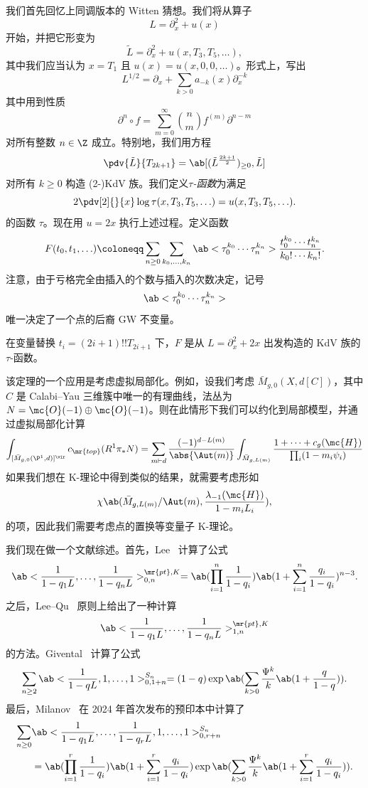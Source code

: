 我们首先回忆上同调版本的 Witten 猜想。我们将从算子
\[ L = \partial_x^2 + u(x) \]
开始，并把它形变为
\[ \tilde{L} = \partial_x^2 + u(x, T_3, T_5, \ldots), \]
其中我们应当认为 \(x = T_1\) 且 \(u(x) = u(x, 0, 0,\ldots)\)。形式上，写出
\[ L^{1/2} = \partial_x + \sum_{k > 0} a_{-k}(x) \partial_x^{-k} \]
其中用到性质
\[ \partial^n \circ f = \sum_{m = 0}^{\infty} \binom{n}{m} f^{(m)} \partial^{n-m} \]
对所有整数 \(n \in \Z\) 成立。特别地，我们用方程
\[ \pdv{\tilde{L}}{T_{2k+1}} = \ab[(\tilde{L}^{\frac{2k+1}{2}})_{\geq 0}, \tilde{L}] \]
对所有 \(k \geq 0\) 构造 (2-)KdV 族。我们定义\textit{\(\tau\)-函数}为满足
\[ 2 \pdv[2]{}{x}\log \tau(x, T_3, T_5, \ldots) = u(x, T_3, T_5, \ldots). \]
的函数 \(\tau\)。现在用 \(u = 2x\) 执行上述过程。定义函数
\[ F(t_0, t_1, \ldots) \coloneqq \sum_{n \geq 0} \sum_{k_0, \ldots, k_n} \ab<\tau_0^{k_0} \cdots \tau_n^{k_n}> \frac{t_0^{k_0} \cdots t_n^{k_n}}{k_0! \cdots k_n!}. \]
注意，由于亏格完全由插入的个数与插入的次数决定，记号
\[ \ab<\tau_0^{k_0} \cdots \tau_n^{k_n}> \]
唯一决定了一个点的后裔 GW 不变量。

\begin{thm}
    在变量替换 \(t_i = (2i+1)!! T_{2i+1}\) 下，\(F\) 是从 \(L = \partial_x^2 + 2x\) 出发构造的 KdV 族的 \(\tau\)-函数。
\end{thm}

该定理的一个应用是考虑虚拟局部化。例如，设我们考虑 \(\bar{M}_{g,0}(X, d[C])\)，其中 \(C\) 是 Calabi–Yau 三维簇中唯一的有理曲线，法丛为 \(N = \mc{O}(-1)\oplus \mc{O}(-1)\)。则在此情形下我们可以约化到局部模型，并通过虚拟局部化计算
\begin{align*}
    \int_{[\bar{M}_{g,0}(\P^1, d)]^{\vir}} c_{\mr{top}}(R^1 \pi_* N) = \sum_{m \vdash d} \frac{(-1)^{d-L(m)}}{\abs{\Aut(m)}} \int_{\bar{M}_{g, L(m)}} \frac{1 + \cdots + c_g(\mc{H})}{\prod_i (1-m_i \psi_i)}
\end{align*}
如果我们想在 K-理论中得到类似的结果，就需要考虑形如
\[ \chi\ab(\bar{M}_{g, L(m)}/\Aut(m), \frac{\lambda_{-1}(\mc{H})}{1-m_i L_i}), \]
的项，因此我们需要考虑点的置换等变量子 K-理论。

我们现在做一个文献综述。首先，Lee~\cite{Lee1997} 计算了公式
\[ \ab<\frac{1}{1-q_1 L}, \ldots, \frac{1}{1-q_n L}>_{0,n}^{\mr{pt}, K} = \ab(\prod_{i=1}^n \frac{1}{1-q_i}) \ab(1 + \sum_{i=1}^n \frac{q_i}{1-q_i})^{n-3}. \]
之后，Lee–Qu~\cite{LeeQu2014} 原则上给出了一种计算
\[ \ab<\frac{1}{1-q_1 L}, \ldots, \frac{1}{1-q_n L}>_{1,n}^{\mr{pt}, K} \]
的方法。Givental~\cite{Givental2017K1} 计算了公式
\[ \sum_{n \geq 2} \ab<\frac{1}{1-q L}, 1, \ldots, 1>_{0,1+n}^{S_n} = (1-q) \exp\ab(\sum_{k > 0} \frac{\Psi^k}{k} \ab(1 + \frac{q}{1-q})). \]
最后，Milanov~\cite{Milanov2025} 在 2024 年首次发布的预印本中计算了
\begin{align*}
    \sum_{n \geq 0}& \ab<\frac{1}{1-q_1 L}, \ldots, \frac{1}{1-q_r L}, 1, \ldots, 1>_{0,r+n}^{S_n} \\
    &= \ab(\prod_{i=1}^{r} \frac{1}{1-q_i})\ab(1 + \sum_{i=1}^r \frac{q_i}{1-q_i}) \exp\ab(\sum_{k > 0} \frac{\Psi^k}{k} \ab(1 + \sum_{i=1}^r \frac{q_i}{1-q_i})). 
\end{align*}

